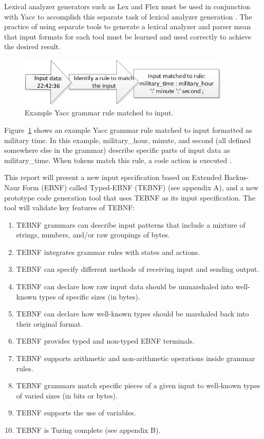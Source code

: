 \indent
Lexical analyzer generators such as Lex and Flex must be used in conjunction with Yacc to accomplish this separate task of lexical analyzer generation \cite{johnson_01,lesk_01}.  The practice of using separate tools to generate a lexical analyzer and parser mean that input formats for each tool must be learned and used correctly to achieve the desired result.

\begin{figure}[htbp]
\centering
\includegraphics[width=0.9\textwidth]{figures/YaccGrammarRule.png}
\caption{Example Yacc grammar rule matched to input.}
\label{fig:YaccGrammarRule}
\end{figure}

\indent
Figure~\ref{fig:YaccGrammarRule} shows an example Yacc grammar rule matched to input formatted as military time.  In this example, military\_hour, minute, and second (all defined somewhere else in the grammar) describe specific parts of input data as military\_time.  When tokens match this rule, a code action is executed \cite{johnson_01,niemann_01}.

\indent
This report will present a new input specification based on Extended Backus-Naur Form (EBNF) called Typed-EBNF (TEBNF) (see appendix A), and a new prototype code generation tool that uses TEBNF as its input specification.  The tool will validate key features of TEBNF:
\begin{enumerate}
  \item TEBNF grammars can describe input patterns that include a mixture of strings, numbers, and/or raw groupings of bytes.
  \item TEBNF integrates grammar rules with states and actions.
  \item TEBNF can specify different methods of receiving input and sending output.
  \item TEBNF can declare how raw input data should be unmarshaled into well-known types of specific sizes (in bytes).
  \item TEBNF can declare how well-known types should be marshaled back into their original format.
  \item TEBNF provides typed and non-typed EBNF terminals.
  \item TEBNF supports arithmetic and non-arithmetic operations inside grammar rules.
  \item TEBNF grammars match specific pieces of a given input to well-known types of varied sizes (in bits or bytes).
  \item TEBNF supports the use of variables.
  \item TEBNF is Turing complete (see appendix B).
\end{enumerate}

